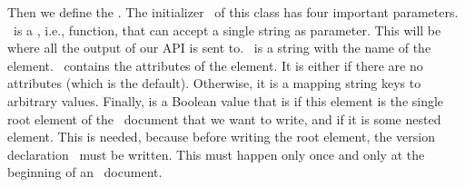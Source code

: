 Then we define the .
The initializer~ of this class has four important parameters.
~is a , i.e., function, that can accept a single string as parameter.
This will be where all the output of our API is sent to.
~is a string with the name of the element.
~contains the attributes of the element.
It is either  if there are no attributes (which is the default).
Otherwise, it is a  mapping string keys to arbitrary values.
Finally,  is a Boolean value that is  if this element is the single root element of the ~document that we want to write, and  if it is some nested element.
This is needed, because before writing the root element, the  version declaration~ must be written.
This must happen only once and only at the beginning of an ~document.

